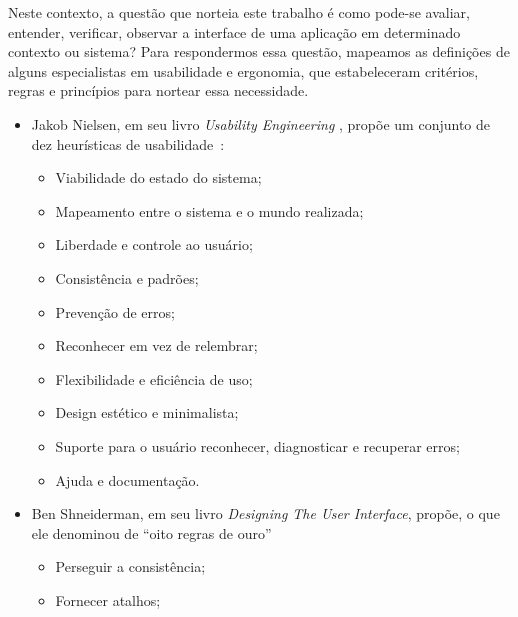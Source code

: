 %
Neste contexto, a questão que norteia este trabalho é como pode-se avaliar,
entender, verificar, observar a interface de uma aplicação em determinado
contexto ou sistema?
%
Para respondermos essa questão, mapeamos as definições de alguns especialistas
em usabilidade e ergonomia, que estabeleceram critérios, regras e princípios
para nortear essa necessidade.

\begin{itemize}
\item Jakob Nielsen, em seu livro \textit{Usability Engineering} , propõe um
conjunto de dez heurísticas de usabilidade~\cite{nielsen1994}:

    \begin{itemize} 

    \item Viabilidade do estado do sistema;

    \item Mapeamento entre o sistema e o mundo realizada;

    \item Liberdade e controle ao usuário;

    \item Consistência e padrões;

    \item Prevenção de erros;

    \item Reconhecer em vez de relembrar;

    \item Flexibilidade e eficiência de uso;

    \item Design estético e minimalista;

    \item Suporte para o usuário reconhecer, diagnosticar e recuperar erros;

    \item Ajuda e documentação.

    \end{itemize}

\item Ben Shneiderman, em seu livro \textit{Designing The User Interface},
propõe, o que ele denominou de ``oito regras de ouro''~\cite{shneiderman2003}

    \begin{itemize} 

    \item Perseguir a consistência;

    \item Fornecer atalhos;


\end{itemize}
\end{itemize}
